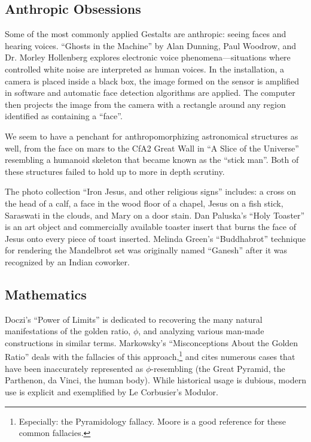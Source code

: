 \documentclass{thesis}
\begin{document}
\subsection{Anthropic Obsessions}
	Some of the most commonly applied Gestalts are anthropic: seeing faces and hearing voices. ``Ghosts in the Machine'' by Alan Dunning, Paul Woodrow, and Dr. Morley Hollenberg\cite{alan_dunning_paul_woodrow_and_morley_hollenberg_einsteins_2008} explores electronic voice phenomena---situations where controlled white noise are interpreted as human voices. In the installation, a camera is placed inside a black box, the image formed on the sensor is amplified in software and automatic face detection algorithms are applied. The computer then projects the image from the camera with a rectangle around any region identified as containing a ``face''.
	
	We seem to have a penchant for anthropomorphizing astronomical structures as well, from the face on mars\cite{brian_dunning_facemars_2008} to the CfA2 Great Wall in ``A Slice of the Universe''\cite{de_lapparent_slice_1986} resembling a humanoid skeleton that became known as the ``stick man''. Both of these structures failed to hold up to more in depth scrutiny.
	
	The photo collection ``Iron Jesus, and other religious signs''\cite{boston.com_religious_????} includes: a cross on the head of a calf, a face in the wood floor of a chapel, Jesus on a fish stick, Saraswati in the clouds, and Mary on a door stain. Dan Paluska's ``Holy Toaster''\cite{dan_paluska_holy_2005} is an art object and commercially available toaster insert that burns the face of Jesus onto every piece of toast inserted. Melinda Green's ``Buddhabrot''\cite{melinda_green_buddhabrot_1993} technique for rendering the Mandelbrot set was originally named ``Ganesh'' after it was recognized by an Indian coworker.
	
\subsection{Mathematics}
	Doczi's ``Power of Limits''\cite{Doczi81} is dedicated to recovering the many natural manifestations of the golden ratio, $\phi$, and analyzing various man-made constructions in similar terms. Markowsky's ``Misconceptions About the Golden Ratio''\cite{markowsky_misconceptions_1992} deals with the fallacies of this approach,\footnote{Especially: the Pyramidology fallacy. Moore\cite{Moore07} is a good reference for these common fallacies.} and cites numerous cases that have been inaccurately represented as $\phi$-resembling (the Great Pyramid, the Parthenon, da Vinci, the human body). While historical usage is dubious, modern use is explicit and exemplified by Le Corbusier's Modulor.\cite{padovan_proportion_1999}
	
\end{document}
